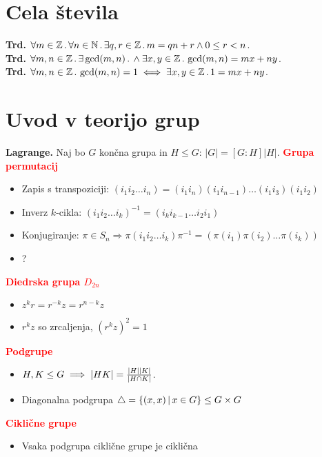 \documentclass[a4paper,oneside,8pt,landscape]{extarticle}
\begin{document}
\begin{multicols*}{3}

\section*{Cela števila}
\textbf{Trd.} \(\forall m \in \mathbb{Z} \,.\, \forall n \in \mathbb{N} \,.\, \exists q, r \in \mathbb{Z} \,.\, m = qn +r \land 0 \leq r < n\).\\
\textbf{Trd.} \(\forall m, n \in \mathbb{Z} \,.\, \exists \gcd(m,n) \,.\, \land \exists x, y \in \mathbb{Z} \,.\, \gcd(m ,n) = mx + ny\).\\
\textbf{Trd.} \(\forall m, n \in \mathbb{Z} \,.\, \gcd(m, n) = 1 \iff \exists x, y \in \mathbb{Z} \,.\, 1 = mx + ny\).

\section{Uvod v teorijo grup}
\textbf{Lagrange.} Naj bo \(G\) končna grupa in \(H \leq G\): \(|G| = [G:H] |H|\).
\textbf{\textcolor{red}{Grupa permutacij}}
\begin{itemize}
    \item Zapis s transpoziciji: \((i_1 i_2 \ldots i_n) = (i_1 i_n)(i_1 i_{n-1}) \ldots (i_1 i_3)(i_1 i_2)\)
    \item Inverz \(k\)-cikla: \((i_1 i_2 \ldots i_k)^{-1}  = (i_k i_{k-1} \ldots i_2 i_1)\)
    \item Konjugiranje: \(\pi \in S_n \Rightarrow \pi (i_1 i_2 \ldots i_k) \pi^{-1} = (\pi(i_1) \pi(i_2) \ldots \pi(i_k))\)
    \item {}?
\end{itemize}
%
%
\textbf{\textcolor{red}{Diedrska grupa \(D_{2n}\)}}
\begin{itemize}
    \item \(z^kr = r^{-k}z = r^{n - k}z\)
    \item \(r^kz\) so zrcaljenja, \((r^kz)^2 = 1\)
\end{itemize}
%
%
\textbf{\textcolor{red}{Podgrupe}}
\begin{itemize}
    \item \(H, K \leq G \implies |HK| = \frac{|H||K|}{|H \cap K|}\).
    \item Diagonalna podgrupa \(\triangle = \{(x, x) \,|\, x \in G\} \leq G \times G\) 
\end{itemize}
%
%
\textbf{\textcolor{red}{Ciklične grupe}}
\begin{itemize}
    \item Vsaka podgrupa ciklične grupe je ciklična

\end{itemize}
\end{multicols*}
\end{document}
